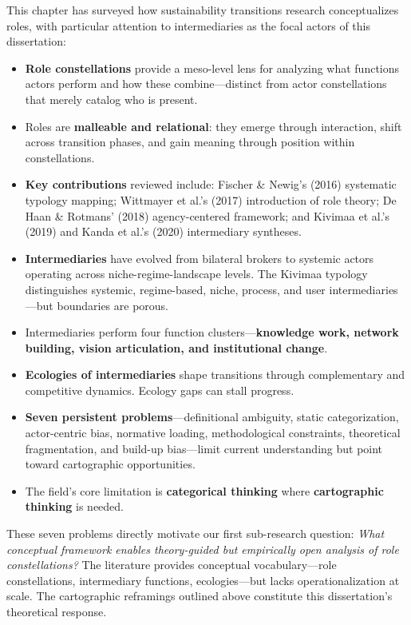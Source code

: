 \documentclass[../main.tex]{subfiles}
\begin{document}
\begin{summarybox}
This chapter has surveyed how sustainability transitions research conceptualizes roles, with particular attention to intermediaries as the focal actors of this dissertation:

\begin{itemize}[leftmargin=*, itemsep=0.3em]
\item \textbf{Role constellations} provide a meso-level lens for analyzing what functions actors perform and how these combine---distinct from actor constellations that merely catalog who is present.

\item Roles are \textbf{malleable and relational}: they emerge through interaction, shift across transition phases, and gain meaning through position within constellations.

\item \textbf{Key contributions} reviewed include: Fischer \& Newig's (2016) systematic typology mapping; Wittmayer et al.'s (2017) introduction of role theory; De Haan \& Rotmans' (2018) agency-centered framework; and Kivimaa et al.'s (2019) and Kanda et al.'s (2020) intermediary syntheses.

\item \textbf{Intermediaries} have evolved from bilateral brokers to systemic actors operating across niche-regime-landscape levels. The Kivimaa typology distinguishes systemic, regime-based, niche, process, and user intermediaries---but boundaries are porous.

\item Intermediaries perform four function clusters---\textbf{knowledge work, network building, vision articulation, and institutional change}.

\item \textbf{Ecologies of intermediaries} shape transitions through complementary and competitive dynamics. Ecology gaps can stall progress.

\item \textbf{Seven persistent problems}---definitional ambiguity, static categorization, actor-centric bias, normative loading, methodological constraints, theoretical fragmentation, and build-up bias---limit current understanding but point toward cartographic opportunities.

\item The field's core limitation is \textbf{categorical thinking} where \textbf{cartographic thinking} is needed.
\end{itemize}

\noindent These seven problems directly motivate our first sub-research question: \textit{What conceptual framework enables theory-guided but empirically open analysis of role constellations?} The literature provides conceptual vocabulary---role constellations, intermediary functions, ecologies---but lacks operationalization at scale. The cartographic reframings outlined above constitute this dissertation's theoretical response.
\end{summarybox}
\end{document}
